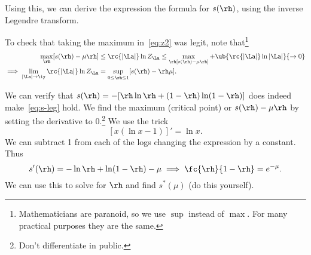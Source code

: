 Using this, we can derive the expression the formula for $s(\rh)$, using the inverse Legendre transform.

To check that taking the maximum in~\eqref{eq:z2} was legit, note that\footnote{Mathematicians are paranoid, so we use $\sup$ instead of $\max$. For many practical purposes they are the same.}
\begin{align*}%
\max_{\rh}[s(\rh) - \mu \rh] &\le \rc{|\La|}\ln Z_{\La} \le \max_\rh [s(\rh)-\mu \rh] + \ub{\rc{|\La|}\ln |\La|}{\to 0}\\
\implies
\lim_{|\La|\to \iy} \rc{|\La|}\ln Z_{\La} &= \sup_{0\le \rh\le 1} [s(\rh) - \rh \mu].
\end{align*}


We can verify that  $s(\rh) = -[\rh\ln \rh +(1-\rh) \ln (1-\rh)]$
does indeed make~\eqref{eq:s-leg} hold. We find the maximum (critical point) or $s(\rh)-\mu \rh$ by setting the derivative to 0.\footnote{Don't differentiate in public.} 
We use the trick 
\[[x(\ln x-1)]'=\ln x.\] We can subtract 1 from each of the logs changing the expression by a constant. Thus
\[
s'(\rh) = -\ln \rh +\ln (1-\rh) - \mu \implies \fc{\rh}{1-\rh}=e^{-\mu}.
\]
We can use this to solve for $\rh$ and find $s^*(\mu)$ (do this yourself).

